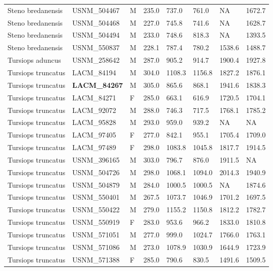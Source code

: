 \begin{longtable}{|p{1.95in}p{1.1in}p{.15in}p{.4in}p{.4in}p{.4in}p{.4in}p{.4in}|}
  Steno bredanensis & USNM\_504467 & M & 235.0 & 737.0 & 761.0 & NA & 1672.7 \\ 
  Steno bredanensis & USNM\_504468 & M & 227.0 & 745.8 & 741.6 & NA & 1628.7 \\ 
  Steno bredanensis & USNM\_504494 & M & 233.0 & 748.6 & 818.3 & NA & 1393.5 \\ 
  Steno bredanensis & USNM\_550837 & M & 228.1 & 787.4 & 780.2 & 1538.6 & 1488.7 \\ 
  Tursiops aduncus & USNM\_258642 & M & 287.0 & 905.2 & 914.7 & 1900.4 & 1927.8 \\ 
  Tursiops truncatus & LACM\_84194 & M & 304.0 & 1108.3 & 1156.8 & 1827.2 & 1876.1 \\ 
  Tursiops truncatus & \textbf{ LACM\_84267 } & M & 305.0 & 865.6 & 868.1 & 1941.6 & 1838.3 \\ 
  Tursiops truncatus & LACM\_84271 & F & 285.0 & 663.1 & 616.9 & 1720.5 & 1704.1 \\ 
  Tursiops truncatus & LACM\_92072 & M & 288.0 & 746.3 & 717.5 & 1768.1 & 1785.2 \\ 
  Tursiops truncatus & LACM\_95828 & M & 293.0 & 959.0 & 939.2 & NA & NA  \\ 
  Tursiops truncatus & LACM\_97405 & F & 277.0 & 842.1 & 955.1 & 1705.4 & 1709.0 \\ 
  Tursiops truncatus & LACM\_97489 & F & 298.0 & 1083.8 & 1045.8 & 1817.7 & 1914.5 \\ 
  Tursiops truncatus & USNM\_396165 & M & 303.0 & 796.7 & 876.0 & 1911.5 & NA  \\ 
  Tursiops truncatus & USNM\_504726 & M & 298.0 & 1068.1 & 1094.0 & 2014.3 & 1940.9 \\ 
  Tursiops truncatus & USNM\_504879 & M & 284.0 & 1000.5 & 1000.5 & NA & 1874.6 \\ 
  Tursiops truncatus & USNM\_550401 & M & 267.5 & 1073.7 & 1046.9 & 1701.2 & 1697.5 \\ 
  Tursiops truncatus & USNM\_550422 & M & 279.0 & 1155.2 & 1150.8 & 1812.2 & 1782.7 \\ 
  Tursiops truncatus & USNM\_550919 & F & 283.0 & 953.6 & 966.2 & 1833.0 & 1810.8 \\ 
  Tursiops truncatus & USNM\_571051 & M & 277.0 & 999.0 & 1024.7 & 1766.0 & 1763.1 \\ 
  Tursiops truncatus & USNM\_571086 & M & 273.0 & 1078.9 & 1030.9 & 1644.9 & 1723.9 \\ 
  Tursiops truncatus & USNM\_571388 & F & 285.0 & 790.6 & 830.5 & 1491.6 & 1509.5 \\ 

\end{longtable}
